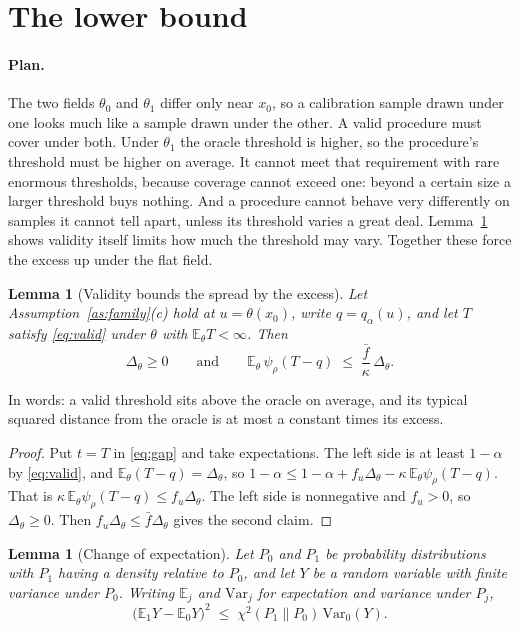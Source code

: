 \documentclass[11pt]{article}
\newtheorem{lemma}[theorem]{Lemma}
\theoremstyle{definition}
\theoremstyle{remark}
\newcommand{\E}{\mathbb{E}}
\newcommand{\Var}{\mathrm{Var}}
\newcommand{\chis}{\chi^2}
\begin{document}
\section{The lower bound}\label{sec:lower}

\paragraph{Plan.}
The two fields $\theta_0$ and $\theta_1$ differ only near $x_0$, so a calibration sample
drawn under one looks much like a sample drawn under the other. A valid procedure must cover
under both. Under $\theta_1$ the oracle threshold is higher, so the procedure's threshold
must be higher on average. It cannot meet that requirement with rare enormous thresholds,
because coverage cannot exceed one: beyond a certain size a larger threshold buys nothing.
And a procedure cannot behave very differently on samples it cannot tell apart, unless its
threshold varies a great deal. Lemma~\ref{lem:curv} shows validity itself limits how much
the threshold may vary. Together these force the excess up under the flat field.

\begin{lemma}[Validity bounds the spread by the excess]\label{lem:curv}
Let Assumption~\ref{as:family}(c) hold at $u=\theta(x_0)$, write $q=q_\alpha(u)$, and let
$T$ satisfy \eqref{eq:valid} under $\theta$ with $\E_\theta T<\infty$. Then
\[
  \Delta_\theta\ge 0
  \qquad\text{and}\qquad
  \E_\theta\,\psi_\rho(T-q)\;\le\;\frac{\bar f}{\kappa}\,\Delta_\theta .
\]
\end{lemma}

In words: a valid threshold sits above the oracle on average, and its typical squared
distance from the oracle is at most a constant times its excess.

\begin{proof}
Put $t=T$ in \eqref{eq:gap} and take expectations. The left side is at least $1-\alpha$ by
\eqref{eq:valid}, and $\E_\theta(T-q)=\Delta_\theta$, so
$1-\alpha\le 1-\alpha+f_u\Delta_\theta-\kappa\,\E_\theta\psi_\rho(T-q)$. That is
$\kappa\,\E_\theta\psi_\rho(T-q)\le f_u\Delta_\theta$. The left side is nonnegative and
$f_u>0$, so $\Delta_\theta\ge0$. Then $f_u\Delta_\theta\le\bar f\Delta_\theta$ gives the
second claim.
\end{proof}

\begin{lemma}[Change of expectation]\label{lem:chi}
Let $P_0$ and $P_1$ be probability distributions with $P_1$ having a density relative to
$P_0$, and let $Y$ be a random variable with finite variance under $P_0$. Writing $\E_j$
and $\Var_j$ for expectation and variance under $P_j$,
\[
  \big(\E_1Y-\E_0Y\big)^2\;\le\;\chis(P_1\|P_0)\,\Var_0(Y).
\]
\end{lemma}
\end{document}
